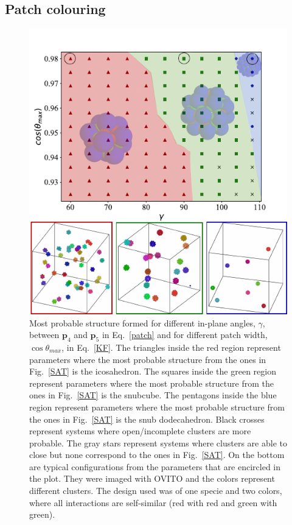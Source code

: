 \documentclass[a4paper, amsfonts, amssymb, amsmath, reprint, showkeys, nofootinbib, oneside]{revtex4-1}
\begin{document}

\subsection{Patch colouring}


\begin{figure}[t]
	\includegraphics{fig3.pdf}
	\caption{\label{N1c2} Most probable structure formed for different in-plane angles, $\gamma$, between $\textbf{p}_4$ and $\textbf{p}_5$ in Eq.~\ref{patch} and for different patch width, $\cos\theta_{max}$, in Eq.~\ref{KF}. The triangles inside the red region represent parameters where the most probable structure from the ones in Fig.~\ref{SAT} is the icosahedron. The squares inside the green region represent parameters where the most probable structure from the ones in Fig.~\ref{SAT} is the snubcube. The pentagons inside the blue region represent parameters where the most probable structure from the ones in Fig.~\ref{SAT} is the snub dodecahedron. Black crosses represent systems where open/incomplete clusters are more probable. The gray stars represent systems where clusters are able to close but none correspond to the ones in Fig.~\ref{SAT}. On the bottom are typical configurations from the parameters that are encircled in the plot. They were imaged with OVITO and the colors represent different clusters. The design used was of one specie and two colors, where all interactions are self-similar (red with red and green with green).}
\end{figure}
\end{document}
